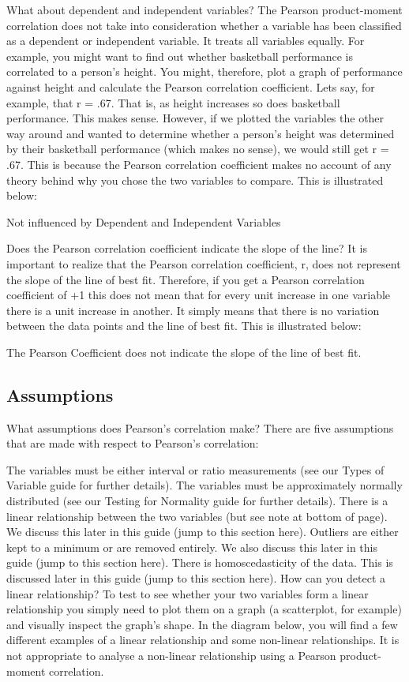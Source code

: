 \documentclass[]{article}
\begin{document}
What about dependent and independent variables?
The Pearson product-moment correlation does not take into consideration whether a variable has been classified as a dependent or independent variable. It treats all variables equally. For example, you might want to find out whether basketball performance is correlated to a person's height. You might, therefore, plot a graph of performance against height and calculate the Pearson correlation coefficient. Lets say, for example, that r = .67. That is, as height increases so does basketball performance. This makes sense. However, if we plotted the variables the other way around and wanted to determine whether a person's height was determined by their basketball performance (which makes no sense), we would still get r = .67. This is because the Pearson correlation coefficient makes no account of any theory behind why you chose the two variables to compare. This is illustrated below:

Not influenced by Dependent and Independent Variables 

Does the Pearson correlation coefficient indicate the slope of the line?
It is important to realize that the Pearson correlation coefficient, r, does not represent the slope of the line of best fit. Therefore, if you get a Pearson correlation coefficient of +1 this does not mean that for every unit increase in one variable there is a unit increase in another. It simply means that there is no variation between the data points and the line of best fit. This is illustrated below:

The Pearson Coefficient does not indicate the slope of the line of best fit. 

\subsection{Assumptions}


What assumptions does Pearson's correlation make?
There are five assumptions that are made with respect to Pearson's correlation:

The variables must be either interval or ratio measurements (see our Types of Variable guide for further details).
The variables must be approximately normally distributed (see our Testing for Normality guide for further details).
There is a linear relationship between the two variables (but see note at bottom of page). We discuss this later in this guide (jump to this section here).
Outliers are either kept to a minimum or are removed entirely. We also discuss this later in this guide (jump to this section here).
There is homoscedasticity of the data. This is discussed later in this guide (jump to this section here).
How can you detect a linear relationship?
To test to see whether your two variables form a linear relationship you simply need to plot them on a graph (a scatterplot, for example) and visually inspect the graph's shape. In the diagram below, you will find a few different examples of a linear relationship and some non-linear relationships. It is not appropriate to analyse a non-linear relationship using a Pearson product-moment correlation.
\end{document}
